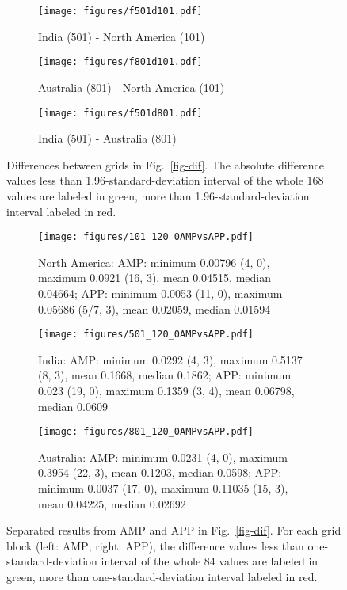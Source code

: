 \begin{figure*}
	\centering
	\begin{subfigure}{1.01\textwidth}
		\texttt{[image: figures/f501d101.pdf]}
		\caption{India (501) - North America (101)}\label{fig-i-n-dif}
	\end{subfigure}
	\vspace{1em}
	\begin{subfigure}{1.01\textwidth}
		\texttt{[image: figures/f801d101.pdf]}
		\caption{Australia (801) - North America (101)}\label{fig-a-n-dif}
	\end{subfigure}
	\vspace{1em}
	\begin{subfigure}{1.01\textwidth}
		\texttt{[image: figures/f501d801.pdf]}
		\caption{India (501) - Australia (801)}\label{fig-i-a-dif}
	\end{subfigure}
	\caption[Differences of differences with test of each plate's paleomagnetic
APWPs versus its FHM predicted APWP]{Differences between grids in
Fig.~\ref{fig-dif}. The absolute difference values less than
1.96-standard-deviation interval of the whole 168 values are labeled in green,
more than 1.96-standard-deviation interval labeled in red.}\label{fig-d-dif}
\end{figure*}

\begin{figure*}
	\centering
	\begin{subfigure}{1.01\textwidth}
		\texttt{[image: figures/101\_120\_0AMPvsAPP.pdf]}
		\caption{North America: AMP: minimum 0.00796 (4, 0), maximum 0.0921 (16,
		3), mean 0.04515, median 0.04664; APP: minimum 0.0053 (11, 0), maximum
		0.05686 (5/7, 3), mean 0.02059, median 0.01594}\label{fig-na-difAMPvsAPP}
	\end{subfigure}
	\vspace{.1em}
	\begin{subfigure}{1.01\textwidth}
		\texttt{[image: figures/501\_120\_0AMPvsAPP.pdf]}
		\caption{India: AMP: minimum 0.0292 (4, 3), maximum 0.5137 (8, 3), mean
		0.1668, median 0.1862; APP: minimum 0.023 (19, 0), maximum 0.1359 (3,
		4), mean 0.06798, median 0.0609}\label{fig-in-difAMPvsAPP}
	\end{subfigure}
	\vspace{.1em}
	\begin{subfigure}{1.01\textwidth}
		\texttt{[image: figures/801\_120\_0AMPvsAPP.pdf]}
		\caption{Australia: AMP: minimum 0.0231 (4, 0), maximum 0.3954 (22,
		3), mean 0.1203, median 0.0598; APP: minimum 0.0037 (17, 0), maximum
		0.11035 (15, 3), mean 0.04225, median 0.02692}\label{fig-au-difAMPvsAPP}
	\end{subfigure}
	\caption[Differences with test of each plate's paleomagnetic APWPs versus
its FHM predicted APWP (AMP vs APP)]{Separated results from AMP and APP in
Fig.~\ref{fig-dif}. For each grid block (left: AMP; right: APP), the difference
values less than one-standard-deviation interval of the whole 84 values are
labeled in green, more than one-standard-deviation interval labeled in
red.}\label{fig-difAMPvsAPP}
\end{figure*}

